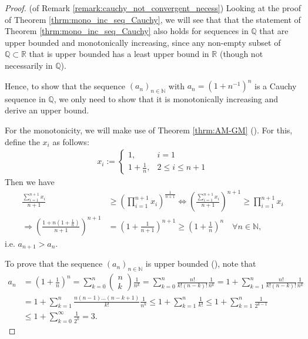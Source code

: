 \begin{proof}(of Remark \ref{remark:cauchy_not_convergent_necess}) 
	Looking at the proof of Theorem \ref{thrm:mono_inc_seq_Cauchy}, we will see that that the statement of Theorem \ref{thrm:mono_inc_seq_Cauchy} also holds for sequences in $\mathbb Q$ that are upper bounded and monotonically increasing, since any non-empty subset of $\mathbb Q\subset \mathbb R$ that is upper bounded has a least upper bound in $\mathbb R$ (though not necessarily in $\mathbb Q$). 
	
	Hence, to show that the sequence $(a_n)_{n\in\mathbb N}$ with $a_n = \left(1 + n^{-1}\right)^n$ is a Cauchy sequence in $\mathbb Q$, we only need to show that it is monotonically increasing and derive an upper bound.
	
	For the monotonicity, we will make use of Theorem \ref{thrm:AM-GM} (\cite{64864}). For this, define the $x_i$ as follows: 
	\begin{align}
		x_i := \begin{cases}
			1, & i = 1
			\\ 1 + \frac{1}{n}, & 2 \leq i \leq n + 1
		\end{cases}
	\end{align}
	Then we have
	\begin{align}
		\frac{\sum_{i=1}^{n + 1}x_i}{n + 1} &\geq \left(\prod_{i = 1}^{n + 1}x_i\right)^{\frac{1}{n+1}} 
		\Leftrightarrow \left(\frac{\sum_{i=1}^{n + 1}x_i}{n + 1}\right)^{n+1} \geq \prod_{i = 1}^{n + 1}x_i
		\\ \Rightarrow \left(\frac{1 + n\left(1 + \frac{1}{n}\right)}{n+1}\right)^{n + 1} &= \left(1 + \frac{1}{n + 1}\right)^{n + 1} \geq \left(1 + \frac{1}{n}\right)^n \quad\forall n\in\mathbb N,
	\end{align}
	i.e. $a_{n+1} > a_n$.
	
	To prove that the sequence $(a_n)_{n\in\mathbb N}$ is upper bounded (\cite{5065619}), note that
	\begin{align}
		a_n &= \left(1 + \frac{1}{n}\right)^n = \sum_{k=0}^{n}\begin{pmatrix}
			n \\ k
		\end{pmatrix}\frac{1}{n^k} = \sum_{k = 0}^{n}\frac{n!}{k!(n-k)!}\frac{1}{n^k} = 1 + \sum_{k = 1}^{n}\frac{n!}{k!(n-k)!}\frac{1}{n^k}
		\\ &= 1 + \sum_{k = 1}^{n}\frac{n(n-1)\dots (n-k+1)}{k!}\frac{1}{n^k} \leq 1 + \sum_{k=1}^{n}\frac{1}{k!} \leq 1 + \sum_{k=1}^{n}\frac{1}{2^{k-1}}
		\\ &\leq 1 + \sum_{k=0}^{\infty}\frac{1}{2^k} = 3.
	\end{align}
\end{proof}

